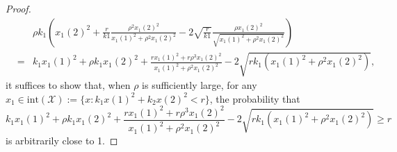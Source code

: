\documentclass[sn-mathphys]{JORSC-jnl}%
\theoremstyle{thmstyleone}%
\theoremstyle{thmstylethree}%
\begin{document}
\begin{proof}
\begin{eqnarray}
		&& \rho k_1 \left(x_1(2)^2 + \frac{r}{k1}\frac{\rho^2x_1(2)^2}{x_1(1)^{2} + \rho^{2} x_1(2)^{2}} - 2\sqrt{\frac{r}{k1}}\frac{\rho x_1(2)^2}{\sqrt{x_1(1)^{2} + \rho^{2} x_1(2)^{2}}}\right) \nonumber\\
		&=& k_1 x_1(1)^2 + \rho k_1 x_1(2)^2 + \frac{rx_1(1)^{2} + r \rho^3x_1(2)^{2}}{x_1(1)^{2} + \rho^{2} x_1(2)^{2}} - 2\sqrt{rk_1\left(x_1(1)^{2} + \rho^{2} x_1(2)^{2}\right)}, \nonumber
	\end{eqnarray}
	it suffices to show that, when $\rho$ is sufficiently large, for any $x_1 \in \text{int}(\mathcal{X}) := \{ x : k_1 x(1)^2 + k_2 x(2)^2 < r \}$, the probability that
	\begin{equation}\label{eq3}
		k_1 x_1(1)^2 + \rho k_1 x_1(2)^2 + \dfrac{r x_1(1)^2 + r \rho^3 x_1(2)^2}{x_1(1)^2 + \rho^2 x_1(2)^2} - 2 \sqrt{ r k_1 \left( x_1(1)^2 + \rho^2 x_1(2)^2 \right) } \ge r
	\end{equation}
	is arbitrarily close to 1.
	

\end{proof}
\end{document}
